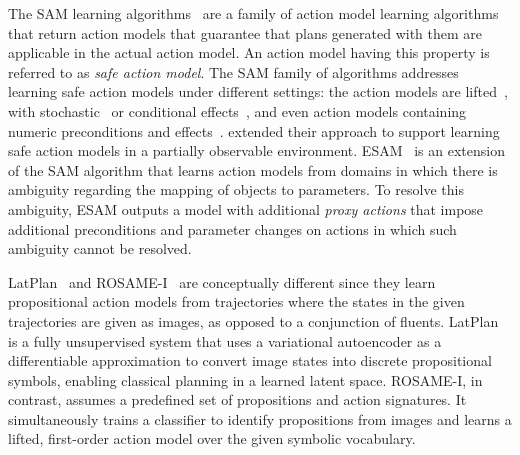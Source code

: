 \documentclass{article}
\theoremstyle{definition}
\theoremstyle{remark}
\newcommand{\sam}{\ac{SAM}\xspace}
\newif\ifaddcomments
\newcommand{\roni}[1]{\ifaddcomments{\textcolor{red}{[Roni: #1]}}\fi}
\newcommand{\yarin}[1]{\ifaddcomments{\textcolor{teal}{[Yarin: #1]}}\fi}
\begin{document}
The \sam learning algorithms~\citep{stern2017efficient,mordoch2023learning,juba2021safe,juba2022learning,le2024learning,mordoch2024safe} are a family of action model learning algorithms that return action models that guarantee that plans generated with them are applicable in the actual action model. 
An action model having this property is referred to as \emph{safe action model}.
The \sam family of algorithms addresses learning safe action models under different settings: 
the action models are lifted~\citep{juba2021safe}, with stochastic~\citep{juba2022learning} or conditional effects~\citep{mordoch2024safe}, and even action models containing numeric preconditions and effects~\citep{mordoch2023learning}.
\citet{le2024learning} extended their approach to support learning safe action models in a partially observable environment. 
ESAM~\citep{juba2021safe} is an extension of the \sam algorithm that learns action models from domains in which there is ambiguity regarding the mapping of objects to parameters. To resolve this ambiguity, ESAM outputs a model with additional \emph{proxy actions} that impose additional preconditions and parameter changes on actions in which such ambiguity cannot be resolved. 



LatPlan~\citep{asai2022classical} and ROSAME-I~\citep{xi2024neuro} are conceptually different since they learn propositional action models from trajectories where the states in the given trajectories are given as images, as opposed to a conjunction of fluents. 
LatPlan is a fully unsupervised system that uses a variational autoencoder as a differentiable approximation to convert image states into discrete propositional symbols, enabling classical planning in a learned latent space.
ROSAME-I, in contrast, assumes a predefined set of propositions and action signatures. It simultaneously trains a classifier to identify propositions from images and learns a lifted, first-order action model over the given symbolic vocabulary.
\end{document}
